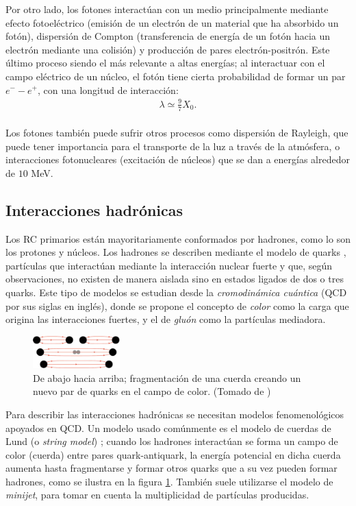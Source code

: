 	Por otro lado, los fotones interactúan con un medio principalmente mediante efecto fotoeléctrico (emisión de un electrón de un material que ha absorbido un fotón), dispersión de Compton (transferencia de energía de un fotón hacia un electrón mediante una colisión) y producción de pares electrón-positrón. Este último proceso siendo el más relevante a altas energías; al interactuar con el campo eléctrico de un núcleo, el fotón tiene cierta probabilidad de formar un par $e^{-}-e^{+}$, con una longitud de interacción:
	\begin{align}
	\lambda \simeq \frac{9}{7} X_0.
	\end{align}	
 	\\ 
	Los fotones también puede sufrir otros procesos como dispersión de Rayleigh, que puede tener importancia para el transporte de la luz a través de la atmósfera, o interacciones fotonucleares (excitación de núcleos) que se dan a energías alrededor de $10$ MeV.
	
	\subsection{Interacciones hadrónicas}
	Los RC primarios están mayoritariamente conformados por hadrones, como lo son los protones y núcleos. Los hadrones se describen mediante el modelo de quarks \cite{DeAngelis2015}, partículas que interactúan mediante la interacción nuclear fuerte y que, según observaciones, no existen de manera aislada sino en estados ligados de dos o tres quarks. Este tipo de modelos se estudian desde la \textit{cromodinámica cuántica} (QCD por sus siglas en inglés), donde se propone el concepto de \textit{color} como la carga que origina las interacciones fuertes, y el de \textit{gluón} como la partículas mediadora. \\
		
	\begin{figure}
	\includegraphics[width=0.3\textwidth]{Figuras/string_frag} 
	\caption{De abajo hacia arriba; fragmentación de una cuerda creando un nuevo par de quarks en el campo de color. (Tomado de \cite{DeAngelis2015})}
	\label{fig:string}
	\end{figure}		
	
	Para describir las interacciones hadrónicas se necesitan modelos fenomenológicos apoyados en QCD. Un modelo usado comúnmente es el modelo de cuerdas de Lund (o \textit{string model}) \cite{FragModels}; cuando los hadrones interactúan se forma un campo de color (cuerda) entre pares quark-antiquark, la energía potencial en dicha cuerda aumenta hasta fragmentarse y formar otros quarks que a su vez pueden formar hadrones, como se ilustra en la figura \ref{fig:string}. También suele utilizarse el modelo de \textit{minijet}, para tomar en cuenta la multiplicidad de partículas producidas. \\

